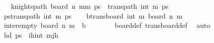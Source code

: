 \begin{isabellebody}
\ \ \ {\isachardoublequoteopen}knights{\isacharunderscore}{\kern0pt}path\ {\isacharparenleft}{\kern0pt}board\ n\ {\isacharparenleft}{\kern0pt}mm\ {\isacharparenleft}{\kern0pt}ps\ {\isacharat}{\kern0pt}\ {\isacharparenleft}{\kern0pt}trans{\isacharunderscore}{\kern0pt}path\ {\isacharparenleft}{\kern0pt}{}{\isacharcomma}{\kern0pt}int\ m\ ps\isanewline
%
\isadelimproof
%
\endisadelimproof
%
\isatagproof
{}\isamarkupfalse%
\ {\isacharminus}{\kern0pt}\isanewline
\ \ \isamarkupfalse%
\ {\isacharquery}{\kern0pt}pstrans{\isacharunderscore}{\kern0pt}path\ {\isacharparenleft}{\kern0pt}{}{\isacharcomma}{\kern0pt}int\ m\ ps\isanewline
\ \ \isamarkupfalse%
\ {\isacharquery}{\kern0pt}b{\isacharequal}{\kern0pt}{\isachardoublequoteopen}trans{\isacharunderscore}{\kern0pt}board\ {\isacharparenleft}{\kern0pt}{}{\isacharcomma}{\kern0pt}int\ m\ {\isacharparenleft}{\kern0pt}board\ n\ m\isanewline
\ \ \isamarkupfalse%
\ inter{\isacharunderscore}{\kern0pt}empty{\isacharcolon}{\kern0pt}\ {\isachardoublequoteopen}board\ n\ m\ {\isasyminter}\ {\isacharquery}{\kern0pt}b\ {\isacharequal}{\kern0pt}\ {\isacharbraceleft}{\kern0pt}{\isacharbraceright}{\kern0pt}{\isachardoublequoteclose}\isanewline
\ \ \ \ \isamarkupfalse%
\ board{\isacharunderscore}{\kern0pt}def\ trans{\isacharunderscore}{\kern0pt}board{\isacharunderscore}{\kern0pt}def\ \isamarkupfalse%
\ auto\isanewline
\ \ \isamarkupfalse%
\ {\isachardoublequoteopen}hd\ {\isacharquery}{\kern0pt}ps\ {\isacharequal}{\kern0pt}\ {\isacharparenleft}{\kern0pt}i\isactrlsub h{\isacharcomma}{\kern0pt}int\ mj\isactrlsub h{\isacharparenright}{\kern0pt}{\isachardoublequoteclose}\isanewline

\end{isabellebody}

